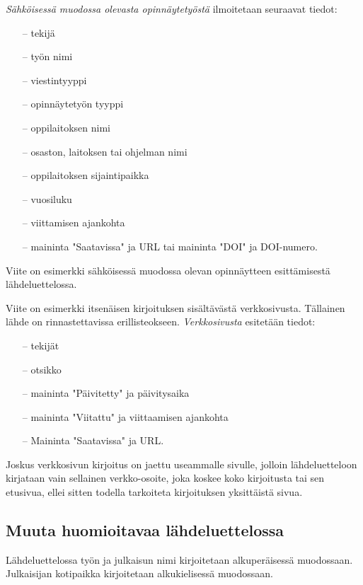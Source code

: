 \documentclass[finnish, 12pt, a4paper, sci, utf8, pdfa]{aaltothesis}
\begin{document}
\textit{Sähköisessä muodossa olevasta opinnäytetyöstä} ilmoitetaan
seuraavat tiedot:
 
\begin{itemize}
\item[--]tekijä
\item[--]työn nimi
\item[--]viestintyyppi
\item[--]opinnäytetyön tyyppi
\item[--]oppilaitoksen nimi
\item[--]osaston, laitoksen tai ohjelman nimi
\item[--]oppilaitoksen sijaintipaikka
\item[--]vuosiluku
\item[--]viittamisen ajankohta
\item[--]maininta "Saatavissa" ja URL tai 
        maininta "DOI" ja DOI-numero.
\end{itemize}

Viite \cite{Adida} on esimerkki sähköisessä muodossa olevan
opinnäytteen esittämisestä lähdeluettelossa.

Viite \cite{viittaaminen} on esimerkki itsenäisen kirjoituksen sisältävästä
verkkosivusta. Tällainen lähde on rinnastettavissa erillisteokseen.
\textit{Verkkosivusta} esitetään tiedot:

\begin{itemize}
\item[--] tekijät
\item[--] otsikko
\item[--] maininta "Päivitetty" ja päivitysaika 
\item[--] maininta "Viitattu" ja viittaamisen ajankohta
\item[--] Maininta "Saatavissa" ja URL.
\end{itemize}

Joskus verkkosivun kirjoitus on jaettu useammalle sivulle, jolloin
lähdeluetteloon kirjataan vain sellainen verkko-osoite, joka koskee
koko kirjoitusta tai sen etusivua, ellei sitten 
todella tarkoiteta kirjoituksen yksittäistä sivua. 

\subsection*{Muuta huomioitavaa lähdeluettelossa}

Lähdeluettelossa työn ja julkaisun nimi kirjoitetaan alkuperäisessä
muodossaan. Julkaisijan kotipaikka kirjoitetaan alkukielisessä
muodossaan.
\end{document}
